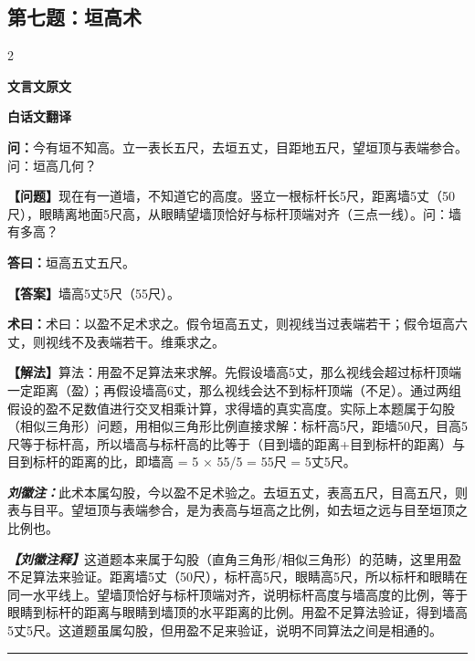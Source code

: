 \documentclass[10pt,a4paper]{article}
\newcommand{\wen}[1]{\textbf{\color{problemcolor}问：}#1\par}
\newcommand{\da}[1]{\textbf{答曰：}#1\par}
\newcommand{\shu}[1]{\textbf{术曰：}#1\par}
\newcommand{\liuhui}[1]{{\color{commentarycolor}\textit{\textbf{刘徽注：}}#1\par}}
\newcommand{\classicalheader}[1]{{\centering\large\bfseries\color{classicalcolor} #1\par\vspace{0.5em}}}
\newcommand{\wenmodern}[1]{\textbf{\color{moderncolor}【问题】}#1\par}
\newcommand{\damodern}[1]{\textbf{【答案】}#1\par}
\newcommand{\shumodern}[1]{\textbf{【解法】}#1\par}
\newcommand{\liuhuimodern}[1]{{\color{commentarycolor}\textit{\textbf{【刘徽注释】}}#1\par}}
\newcommand{\modernheader}[1]{{\centering\large\bfseries\color{moderncolor} #1\par\vspace{0.5em}}}
\newcommand{\problemsec}[1]{\subsection*{#1}}
\begin{document}
\problemsec{第七题：垣高术}
\begin{paracol}{2}
\classicalheader{文言文原文}
\switchcolumn
\modernheader{白话文翻译}
\switchcolumn*

\wen{今有垣不知高。立一表长五尺，去垣五丈，目距地五尺，望垣顶与表端参合。问：垣高几何？}

\switchcolumn

\wenmodern{现在有一道墙，不知道它的高度。竖立一根标杆长5尺，距离墙5丈（50尺），眼睛离地面5尺高，从眼睛望墙顶恰好与标杆顶端对齐（三点一线）。问：墙有多高？}

\switchcolumn*

\da{垣高五丈五尺。}

\switchcolumn

\damodern{墙高5丈5尺（55尺）。}

\switchcolumn*

\shu{术曰：以盈不足术求之。假令垣高五丈，则视线当过表端若干；假令垣高六丈，则视线不及表端若干。维乘求之。}

\switchcolumn

\shumodern{算法：用盈不足算法来求解。先假设墙高5丈，那么视线会超过标杆顶端一定距离（盈）；再假设墙高6丈，那么视线会达不到标杆顶端（不足）。通过两组假设的盈不足数值进行交叉相乘计算，求得墙的真实高度。实际上本题属于勾股（相似三角形）问题，用相似三角形比例直接求解：标杆高5尺，距墙50尺，目高5尺等于标杆高，所以墙高与标杆高的比等于（目到墙的距离+目到标杆的距离）与目到标杆的距离的比，即墙高 = 5 × 55/5 = 55尺 = 5丈5尺。}

\switchcolumn*

\liuhui{此术本属勾股，今以盈不足术验之。去垣五丈，表高五尺，目高五尺，则表与目平。望垣顶与表端参合，是为表高与垣高之比例，如去垣之远与目至垣顶之比例也。}

\switchcolumn

\liuhuimodern{这道题本来属于勾股（直角三角形/相似三角形）的范畴，这里用盈不足算法来验证。距离墙5丈（50尺），标杆高5尺，眼睛高5尺，所以标杆和眼睛在同一水平线上。望墙顶恰好与标杆顶端对齐，说明标杆高度与墙高度的比例，等于眼睛到标杆的距离与眼睛到墙顶的水平距离的比例。用盈不足算法验证，得到墙高5丈5尺。这道题虽属勾股，但用盈不足来验证，说明不同算法之间是相通的。}

\end{paracol}

\vspace{0.3cm}
\hrule
\vspace{0.3cm}
\end{document}
